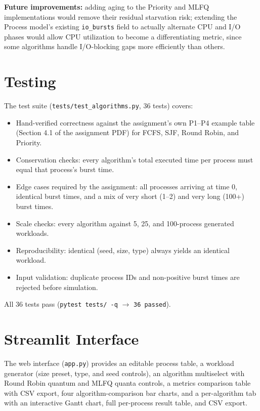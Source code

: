 \documentclass[11pt]{article}
\begin{document}
\textbf{Future improvements:} adding aging to the Priority and MLFQ
implementations would remove their residual starvation risk; extending the
Process model's existing \texttt{io\_bursts} field to actually alternate
CPU and I/O phases would allow CPU utilization to become a differentiating
metric, since some algorithms handle I/O-blocking gaps more efficiently
than others.

\section{Testing}
\label{sec:testing}

The test suite (\texttt{tests/test\_algorithms.py}, 36 tests) covers:

\begin{itemize}
  \item Hand-verified correctness against the assignment's own P1--P4
    example table (Section 4.1 of the assignment PDF) for FCFS, SJF,
    Round Robin, and Priority.
  \item Conservation checks: every algorithm's total executed time per
    process must equal that process's burst time.
  \item Edge cases required by the assignment: all processes arriving at
    time 0, identical burst times, and a mix of very short (1--2) and very
    long (100+) burst times.
  \item Scale checks: every algorithm against 5, 25, and 100-process
    generated workloads.
  \item Reproducibility: identical (seed, size, type) always yields an
    identical workload.
  \item Input validation: duplicate process IDs and non-positive burst
    times are rejected before simulation.
\end{itemize}

All 36 tests pass (\texttt{pytest tests/ -q} $\rightarrow$
\texttt{36 passed}).

\section{Streamlit Interface}

The web interface (\texttt{app.py}) provides an editable process table, a
workload generator (size preset, type, and seed controls), an algorithm
multiselect with Round Robin quantum and MLFQ quanta controls, a metrics
comparison table with CSV export, four algorithm-comparison bar charts,
and a per-algorithm tab with an interactive Gantt chart, full per-process
result table, and CSV export.
\end{document}
